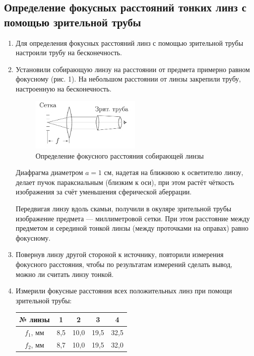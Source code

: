\documentclass[a4paper,12pt]{article}
\begin{document}
	\subsection*{Определение фокусных расстояний тонких линз с помощью зрительной трубы}
	\begin{enumerate}
		\item Для определения фокусных расстояний линз с помощью зрительной трубы настроили трубу на бесконечность.
		
		\item Установили собирающую линзу на расстоянии от предмета примерно равном фокусному (рис. 1). На небольшом расстоянии от линзы закрепили трубу, настроенную на бесконечность.
							
		\begin{figure}
			\begin{center}
				\includegraphics[width = 0.5\textwidth]{412-1.png}
				\caption{Определение фокусного расстояния собирающей линзы}
			\end{center}
		\end{figure}
			
		Диафрагма диаметром $a=1$ см, надетая на ближнюю к осветителю линзу, делает пучок параксиальным (близким к оси), при этом растёт чёткость изображения за счёт уменьшения сферической аберрации.
		
		Передвигая линзу вдоль скамьи, получили в окуляре зрительной трубы
		изображение предмета --- миллиметровой сетки. При этом расстояние между
		предметом и серединой тонкой линзы (между проточками на оправах) равно фокусному.
		
		\item Повернув линзу другой стороной к источнику, повторили измерения фокусного расстояния, чтобы по результатам измерений сделать вывод, можно ли считать линзу тонкой.
		
		\item  Измерили фокусные расстояния всех положительных линз при помощи зрительной трубы:
		
		\begin{center}
			\begin{tabular}{|c|c|c|c|c|}
				\hline
				№ линзы & 1 & 2 & 3 & 4 \\ \hline
				$f_1$, мм & 8,5 & 10,0 & 19,5 & 32,5 \\ \hline
				$f_2$, мм & 8,7 & 10,0 & 19,5 & 32,0 \\ \hline
			\end{tabular}
		\end{center}
	

\end{enumerate}
\end{document}
